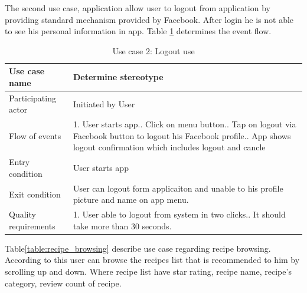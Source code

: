  The second use case, application allow user to logout from application by providing standard mechanism provided by Facebook. After login he is not able to see his personal information in app. Table \ref{table:user_logout} determines the event flow.
  
  \begin{table}[ht]
  	\centering %
  	\begin{tabular}{p{4cm} p{10cm}}  %
  		\hline\hline %
  		Use case name & Determine stereotype \\ %
  		\hline %
  		
  		Participating actor & Initiated by User \\ %
  		Flow of events & 1. User starts app.\newline
  		2. Click on menu button.\newline
  		3. Tap on logout via Facebook button to logout his Facebook profile.\newline
  		4. App shows logout confirmation which includes logout and cancle \\
  		Entry condition & User starts app\\
  		Exit condition & User can logout form applicaiton and unable to his profile picture and name on app menu.\\
  		Quality requirements & 1. User able to logout from system in two clicks.\newline
  		2. It should take more than 30 seconds.\\ [1ex] %
  		\hline %
  	\end{tabular}
  	\caption{Use case 2: Logout use}
  	\label{table:user_logout}
  \end{table}
 
 Table\ref{table:recipe_browsing} describe use case regarding recipe browsing. According to this user can browse the recipes list that is recommended to him by scrolling up and down. Where recipe list have star rating, recipe name, recipe’s category, review count of recipe.
 

